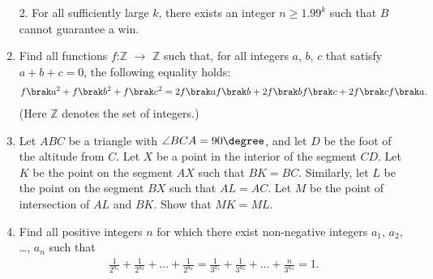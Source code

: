 \documentclass{article}
\begin{document}
\begin{enumerate}
		2. For all sufficiently large $k$, there exists an integer $n\geq{1.99^{k}}$ such that $B$ cannot guarantee a win.
	\item Find all functions $f$:$\mathbb{Z}$ $\rightarrow$ $\mathbb{Z}$  such that, for all integers $a$, $b$, $c$ that satisfy $a+b+c = 0$, the following equality holds:
		\begin{align*}
		f \brak a^2+f \brak b^2+f \brak c^2=2f \brak af \brak b+2f \brak b f \brak c+2f \brak c f \brak a.
		\end{align*}
		(Here $\mathbb{Z}$ denotes the set of integers.)
	\item  Let $ABC$ be a triangle with $\angle{BCA}=90\degree$, and let $D$ be the foot of the altitude from $C$. Let $X$ be a point in the interior of the segment $CD$. Let $K$ be the point on the segment $AX$ such that $BK = BC$. Similarly, let $L$ be the point on the segment $BX$ such that $AL = AC$. Let $M$ be the point of intersection of $AL$ and $BK$.
		Show that $MK = ML$.
	\item  Find all positive integers $n$ for which there exist non-negative integers $a_{1}$, $a_{2}$, \dots, $a_{n}$ such that
		\begin{align*}
		\frac{1}{2^{a_{1}}}+\frac{1}{2^{a_{2}}}+ \dots +\frac{1}{2^{a_{n}}}=\frac{1}{3^{a_{1}}}+\frac{1}{3^{a_{2}}}+ \dots +\frac{n}{3^{a_{n}}}=1.
		\end{align*}
\end{enumerate}
\end{document}
